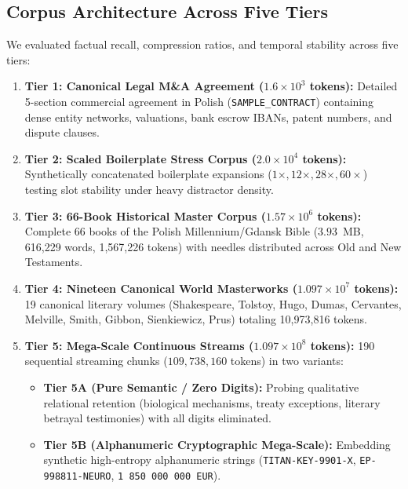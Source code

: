 \documentclass[11pt,a4paper]{article}
\begin{document}
\subsection{Corpus Architecture Across Five Tiers}
We evaluated factual recall, compression ratios, and temporal stability across five tiers:
\begin{enumerate}[leftmargin=*]
    \item \textbf{Tier 1: Canonical Legal M\&A Agreement ($1.6\times 10^3$ tokens):} Detailed 5-section commercial agreement in Polish (\texttt{SAMPLE\_CONTRACT}) containing dense entity networks, valuations, bank escrow IBANs, patent numbers, and dispute clauses.
    \item \textbf{Tier 2: Scaled Boilerplate Stress Corpus ($2.0\times 10^4$ tokens):} Synthetically concatenated boilerplate expansions ($1\times, 12\times, 28\times, 60\times$) testing slot stability under heavy distractor density.
    \item \textbf{Tier 3: 66-Book Historical Master Corpus ($1.57\times 10^6$ tokens):} Complete 66 books of the Polish Millennium/Gdansk Bible ($3.93$~MB, 616,229 words, 1,567,226 tokens) with needles distributed across Old and New Testaments.
    \item \textbf{Tier 4: Nineteen Canonical World Masterworks ($1.097\times 10^7$ tokens):} 19 canonical literary volumes (Shakespeare, Tolstoy, Hugo, Dumas, Cervantes, Melville, Smith, Gibbon, Sienkiewicz, Prus) totaling 10,973,816 tokens.
    \item \textbf{Tier 5: Mega-Scale Continuous Streams ($1.097\times 10^8$ tokens):} 190 sequential streaming chunks ($109,738,160$ tokens) in two variants:
    \begin{itemize}
        \item \textbf{Tier 5A (Pure Semantic / Zero Digits):} Probing qualitative relational retention (biological mechanisms, treaty exceptions, literary betrayal testimonies) with all digits eliminated.
        \item \textbf{Tier 5B (Alphanumeric Cryptographic Mega-Scale):} Embedding synthetic high-entropy alphanumeric strings (\texttt{TITAN-KEY-9901-X}, \texttt{EP-998811-NEURO}, \texttt{1 850 000 000 EUR}).
    \end{itemize}
\end{enumerate}
\end{document}
